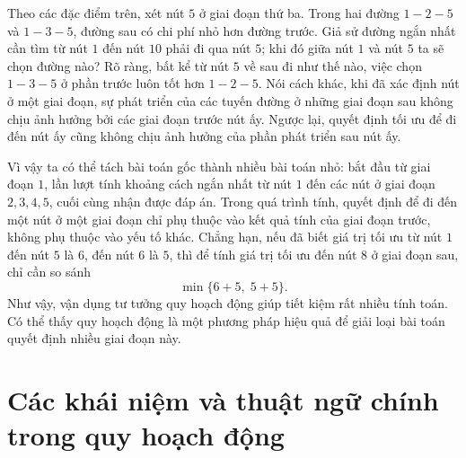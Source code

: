 \documentclass[11pt]{article}
\begin{document}
Theo các đặc điểm trên, xét nút $5$ ở giai đoạn thứ ba. Trong hai đường
$1-2-5$ và $1-3-5$, đường sau có chi phí nhỏ hơn đường trước. Giả sử đường
ngắn nhất cần tìm từ nút $1$ đến nút $10$ phải đi qua nút $5$; khi đó giữa
nút $1$ và nút $5$ ta sẽ chọn đường nào? Rõ ràng, bất kể từ nút $5$ về sau đi
như thế nào, việc chọn $1-3-5$ ở phần trước luôn tốt hơn $1-2-5$. Nói cách
khác, khi đã xác định nút ở một giai đoạn, sự phát triển của các tuyến đường
ở những giai đoạn sau không chịu ảnh hưởng bởi các giai đoạn trước nút ấy.
Ngược lại, quyết định tối ưu để đi đến nút ấy cũng không chịu ảnh hưởng của
phần phát triển sau nút ấy.

Vì vậy ta có thể tách bài toán gốc thành nhiều bài toán nhỏ: bắt đầu từ giai
đoạn $1$, lần lượt tính khoảng cách ngắn nhất từ nút $1$ đến các nút ở giai
đoạn $2,3,4,5$, cuối cùng nhận được đáp án. Trong quá trình tính, quyết định
để đi đến một nút ở một giai đoạn chỉ phụ thuộc vào kết quả tính của giai
đoạn trước, không phụ thuộc vào yếu tố khác. Chẳng hạn, nếu đã biết giá trị
tối ưu từ nút $1$ đến nút $5$ là $6$, đến nút $6$ là $5$, thì để tính giá trị
tối ưu đến nút $8$ ở giai đoạn sau, chỉ cần so sánh
\[
  \min\{6+5,\;5+5\}.
\]
Như vậy, vận dụng tư tưởng quy hoạch động giúp tiết kiệm rất nhiều tính toán.
Có thể thấy quy hoạch động là một phương pháp hiệu quả để giải loại bài toán
quyết định nhiều giai đoạn này.

\section{Các khái niệm và thuật ngữ chính trong quy hoạch động}
\end{document}
